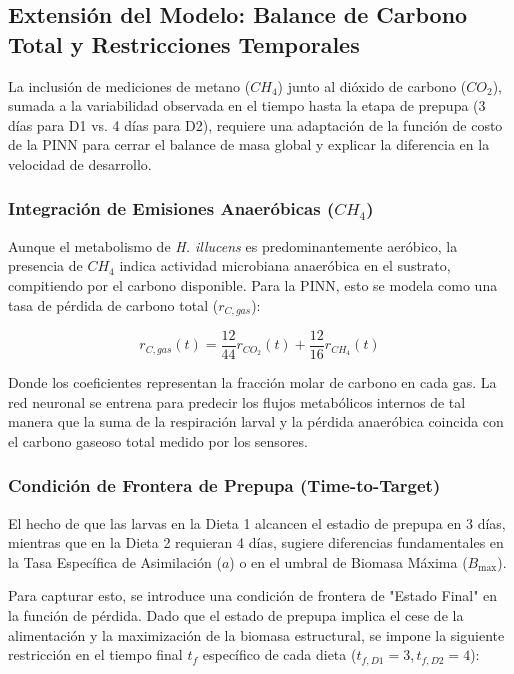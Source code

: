 \subsection{Extensión del Modelo: Balance de Carbono Total y Restricciones Temporales}

La inclusión de mediciones de metano ($CH_4$) junto al dióxido de carbono ($CO_2$), sumada a la variabilidad observada en el tiempo hasta la etapa de prepupa (3 días para D1 vs. 4 días para D2), requiere una adaptación de la función de costo de la PINN para cerrar el balance de masa global y explicar la diferencia en la velocidad de desarrollo.

\subsubsection{Integración de Emisiones Anaeróbicas ($CH_4$)}
Aunque el metabolismo de \textit{H. illucens} es predominantemente aeróbico, la presencia de $CH_4$ indica actividad microbiana anaeróbica en el sustrato, compitiendo por el carbono disponible. Para la PINN, esto se modela como una tasa de pérdida de carbono total ($r_{C,gas}$):

\begin{equation}
r_{C,gas}(t) = \frac{12}{44}r_{CO_2}(t) + \frac{12}{16}r_{CH_4}(t)
\end{equation}

Donde los coeficientes representan la fracción molar de carbono en cada gas. La red neuronal se entrena para predecir los flujos metabólicos internos de tal manera que la suma de la respiración larval y la pérdida anaeróbica coincida con el carbono gaseoso total medido por los sensores.

\subsubsection{Condición de Frontera de Prepupa (Time-to-Target)}
El hecho de que las larvas en la Dieta 1 alcancen el estadio de prepupa en 3 días, mientras que en la Dieta 2 requieran 4 días, sugiere diferencias fundamentales en la Tasa Específica de Asimilación ($a$) o en el umbral de Biomasa Máxima ($B_{\max}$).

Para capturar esto, se introduce una condición de frontera de "Estado Final" en la función de pérdida. Dado que el estado de prepupa implica el cese de la alimentación y la maximización de la biomasa estructural, se impone la siguiente restricción en el tiempo final $t_f$ específico de cada dieta ($t_{f,D1}=3, t_{f,D2}=4$):

